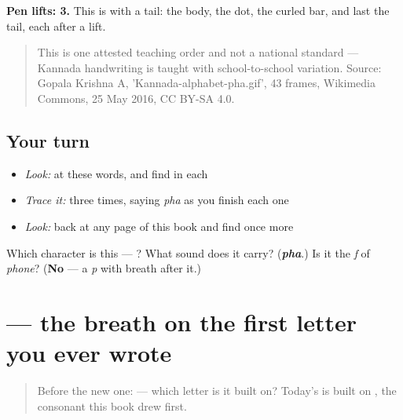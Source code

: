 \textbf{Pen lifts: 3.} This is  with a tail: the body, the dot, the curled bar, and last the tail, each after a lift.

\begin{quote}
This is one attested teaching order and not a national standard — Kannada handwriting is taught with school-to-school variation. Source: Gopala Krishna A, 'Kannada-alphabet-pha.gif', 43 frames, Wikimedia Commons, 25 May 2016, CC BY-SA 4.0.
\end{quote}

\subsection*{Your turn}
\begin{itemize}
\raggedright
  \item \emph{Look:} at these words, and find  in each
\end{itemize}

\begin{quote}
\end{quote}

\begin{itemize}
\raggedright
  \item \emph{Trace it:}  three times, saying \emph{pha} as you finish each one
  \item \emph{Look:} back at any page of this book and find  once more
\end{itemize}

\begin{tcolorbox}[breakable,colback=teal!4,colframe=teal!35!black,title={Before you move on}]
Which character is this — ? What sound does it carry? (\emph{\textbf{pha}}.) Is it the \emph{f} of \emph{phone}? (\textbf{No} — a \emph{p} with breath after it.)
\end{tcolorbox}
\section[\texorpdfstring{\kn{ಖ} (kha)}{ಖ (kha)}]{ — the breath on the first letter you ever wrote}

\label{lesson:KA-S170-letter-kha}



\begin{quote}
Before the new one:  — which letter is it built on? Today's is built on , the consonant this book drew first.
\end{quote}

